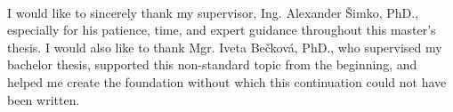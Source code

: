 \newpage
\pagestyle{plain}
~

\vfill
{} I would like to sincerely thank my supervisor, Ing. Alexander Šimko, PhD., especially for his patience, time, and expert guidance throughout this master's thesis. I would also like to thank Mgr. Iveta Bečková, PhD., who supervised my bachelor thesis, supported this non-standard topic from the beginning, and helped me create the foundation without which this continuation could not have been written.
